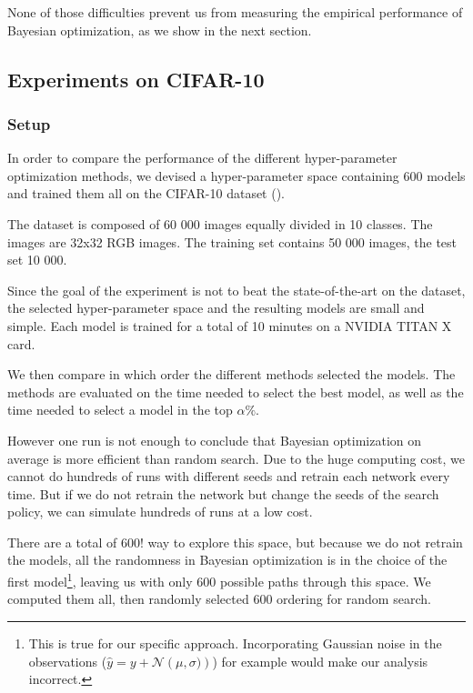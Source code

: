 None of those difficulties prevent us from measuring the empirical performance of Bayesian optimization, as we show in the next section.

\subsection{Experiments on CIFAR-10}
\label{ssec:cifar_analysis}

\subsubsection{Setup}

In order to compare the performance of the different hyper-parameter optimization methods, we devised a hyper-parameter space containing 600 models and trained them all on the CIFAR-10 dataset (\textcite{krizhevsky2009}).

The dataset is composed of 60 000 images equally divided in 10 classes. The images are 32x32 RGB images. The training set contains 50 000 images, the test set 10 000.

Since the goal of the experiment is not to beat the state-of-the-art on the dataset, the selected hyper-parameter space and the resulting models are small and simple. Each model is trained for a total of 10 minutes on a NVIDIA TITAN X card. 

We then compare in which order the different methods selected the models. The methods are evaluated on the time needed to select the best model, as well as the time needed to select a model in the top $\alpha \%$.

However one run is not enough to conclude that Bayesian optimization on average is more efficient than random search. Due to the huge computing cost, we cannot do hundreds of runs with different seeds and retrain each network every time. But if we do not retrain the network but change the seeds of the search policy, we can simulate hundreds of runs at a low cost. 

There are a total of $600!$ way to explore this space, but because we do not retrain the models, all the randomness in Bayesian optimization is in the choice of the first model\footnote{This is true for our specific approach. Incorporating Gaussian noise in the observations ($\hat{y} = y + \mathcal{N} \left( \mu, \sigma)\right)$) for example would make our analysis incorrect.}, leaving us with only 600 possible paths through this space. We computed them all, then randomly selected 600 ordering for random search.

